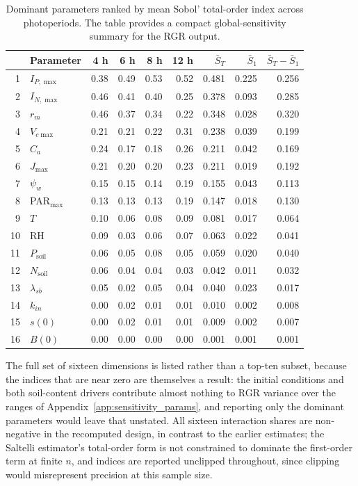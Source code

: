 \documentclass[a4paper,fleqn]{cas-sc}
\begin{document}
\begin{table}[!htbp]
\centering
\caption{Dominant parameters ranked by mean Sobol' total-order index across
photoperiods. The table provides a compact global-sensitivity summary for the
RGR output.}
\label{tab:dominant_sobol_parameters}
\begin{tabular}{@{}rlrrrrrrr@{}}
\toprule
& Parameter & 4 h & 6 h & 8 h & 12 h & $\bar S_T$ & $\bar S_1$ & $\bar S_T-\bar S_1$ \\
\midrule
1  & $I_{P,\max}$         & 0.38 & 0.49 & 0.53 & 0.52 & 0.481 & 0.225 & 0.256 \\
2  & $I_{N,\max}$         & 0.46 & 0.41 & 0.40 & 0.25 & 0.378 & 0.093 & 0.285 \\
3  & $r_m$                & 0.46 & 0.37 & 0.34 & 0.22 & 0.348 & 0.028 & 0.320 \\
4  & $V_{c\max}$          & 0.21 & 0.21 & 0.22 & 0.31 & 0.238 & 0.039 & 0.199 \\
5  & $C_a$                & 0.24 & 0.17 & 0.18 & 0.26 & 0.211 & 0.042 & 0.169 \\
6  & $J_{\max}$           & 0.21 & 0.20 & 0.20 & 0.23 & 0.211 & 0.019 & 0.192 \\
7  & $\psi_w$             & 0.15 & 0.15 & 0.14 & 0.19 & 0.155 & 0.043 & 0.113 \\
8  & PAR$_{\max}$         & 0.13 & 0.13 & 0.13 & 0.19 & 0.147 & 0.018 & 0.130 \\
9  & $T$                  & 0.10 & 0.06 & 0.08 & 0.09 & 0.081 & 0.017 & 0.064 \\
10 & RH                   & 0.09 & 0.03 & 0.06 & 0.07 & 0.063 & 0.022 & 0.041 \\
11 & $P_{\mathrm{soil}}$  & 0.06 & 0.05 & 0.08 & 0.05 & 0.059 & 0.020 & 0.040 \\
12 & $N_{\mathrm{soil}}$  & 0.06 & 0.04 & 0.04 & 0.03 & 0.042 & 0.011 & 0.032 \\
13 & $\lambda_{sb}$       & 0.05 & 0.02 & 0.05 & 0.04 & 0.040 & 0.023 & 0.017 \\
14 & $k_{in}$             & 0.00 & 0.02 & 0.01 & 0.01 & 0.010 & 0.002 & 0.008 \\
15 & $s(0)$               & 0.00 & 0.02 & 0.01 & 0.01 & 0.009 & 0.002 & 0.007 \\
16 & $B(0)$               & 0.00 & 0.00 & 0.00 & 0.00 & 0.001 & 0.001 & 0.001 \\
\bottomrule
\end{tabular}
\end{table}

The full set of sixteen dimensions is listed rather than a top-ten subset,
because the indices that are near zero are themselves a result: the initial
conditions and both soil-content drivers contribute almost nothing to RGR
variance over the ranges of Appendix~\ref{app:sensitivity_params}, and
reporting only the dominant parameters would leave that unstated. All sixteen
interaction shares are non-negative in the recomputed design, in contrast to
the earlier estimates; the Saltelli estimator's total-order form is not
constrained to dominate the first-order term at finite $n$, and indices are
reported unclipped throughout, since clipping would misrepresent precision at this sample
size.
\end{document}
